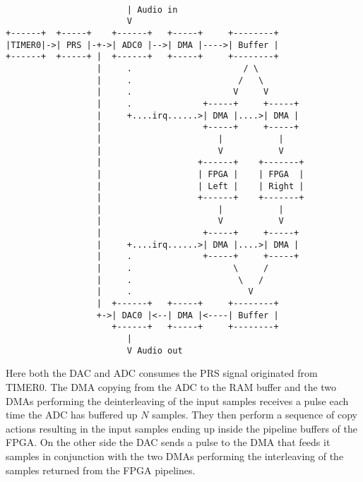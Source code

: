\begin{verbatim}
	
                        | Audio in
                        V
+------+  +-----+    +------+   +-----+     +--------+
|TIMER0|->| PRS |-+->| ADC0 |-->| DMA |---->| Buffer |
+------+  +-----+ |  +------+   +-----+     +--------+
                  |     .                      / \
                  |     .                     /   \
                  |     .                    V     V
                  |     .              +-----+     +-----+
                  |     +....irq......>| DMA |....>| DMA |
                  |                    +-----+     +-----+
                  |                       |           |
                  |                       V           V
                  |                   +------+    +-------+
                  |                   | FPGA |    | FPGA  |
                  |                   | Left |    | Right |
                  |                   +------+    +-------+
                  |                       |           |
                  |                       V           V
                  |                    +-----+     +-----+
                  |     +....irq......>| DMA |....>| DMA |
                  |     .              +-----+     +-----+
                  |     .                    \     /
                  |     .                     \   /
                  |     .                       V
                  |  +------+   +-----+     +--------+
                  +->| DAC0 |<--| DMA |<----| Buffer |
                     +------+   +-----+     +--------+
                        |
                        V Audio out
\end{verbatim} 

Here both the DAC and ADC consumes the PRS signal originated
from TIMER0. The DMA copying from the ADC to the RAM buffer and
the two DMAs performing the deinterleaving of the input samples
receives a pulse each time the ADC has buffered up $N$ samples.
They then perform a sequence of copy actions resulting in the
input samples ending up inside the pipeline buffers of the FPGA.
On the other side the DAC sends a pulse to the DMA that feeds it
samples in conjunction with the two DMAs performing the
interleaving of the samples returned from the FPGA pipelines.
